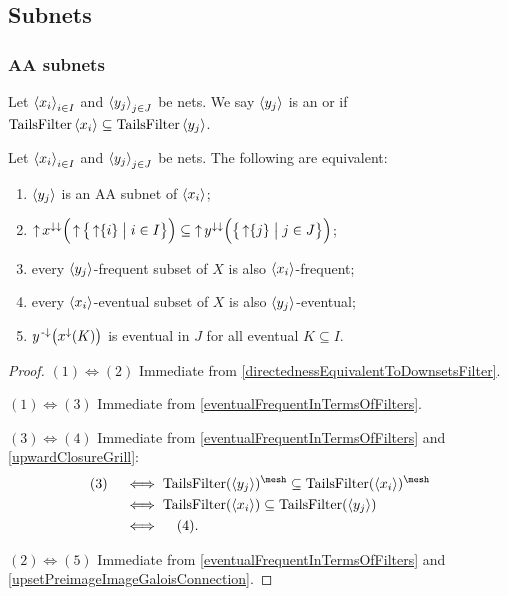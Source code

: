 \subsection{Subnets}
\subsubsection{AA subnets}
\begin{definition}
Let $\left\langle x_i \right\rangle_{i\in I}$ and $\left\langle y_j \right\rangle_{j\in J}$ be nets. We say $\left\langle y_j \right\rangle$ is an  or  if $\operatorname{TailsFilter}\left\langle x_i \right\rangle \subseteq \operatorname{TailsFilter}\left\langle y_j \right\rangle$.
\end{definition}

\begin{lemma} \label{AAsubnetEquivalents}
Let $\left\langle x_i \right\rangle_{i\in I}$ and $\left\langle y_j \right\rangle_{j\in J}$ be nets. The following are equivalent:
\begin{enumerate}
\item $\left\langle y_j \right\rangle$ is an AA subnet of $\left\langle x_i \right\rangle$;
\item $\upset x^{\imf\imf}\Big(\upset\setbuilder[\big]{\upset\{i\}}{i\in I}\Big) \subseteq \upset y^{\imf\imf}\Big(\setbuilder[\big]{\upset\{j\}}{j\in J}\Big)$;
\item every $\left\langle y_j \right\rangle$-frequent subset of $X$ is also $\left\langle x_i \right\rangle$-frequent;
\item every $\left\langle x_i \right\rangle$-eventual subset of $X$ is also $\left\langle y_j \right\rangle$-eventual;
\item $y^{{\text{\hspace{0.15em}-}\downarrow}}\big(x^\downarrow(K)\big)$ is eventual in $J$ for all eventual $K\subseteq I$.
\end{enumerate}
\end{lemma}
\begin{proof}
$(1) \Leftrightarrow (2)$ Immediate from \ref{directednessEquivalentToDownsetsFilter}.

$(1) \Leftrightarrow (3)$ Immediate from \ref{eventualFrequentInTermsOfFilters}.

$(3) \Leftrightarrow (4)$  Immediate from \ref{eventualFrequentInTermsOfFilters} and \ref{upwardClosureGrill}:
\begin{align*}
(3) \quad&\iff \TailsFilter(\seq{y_j})^\mesh \subseteq \TailsFilter(\seq{x_i})^\mesh \\
&\iff \TailsFilter(\seq{x_i}) \subseteq \TailsFilter(\seq{y_j}) \\
&\iff\quad (4).
\end{align*}

$(2) \Leftrightarrow (5)$ Immediate from \ref{eventualFrequentInTermsOfFilters} and \ref{upsetPreimageImageGaloisConnection}.
\end{proof}

